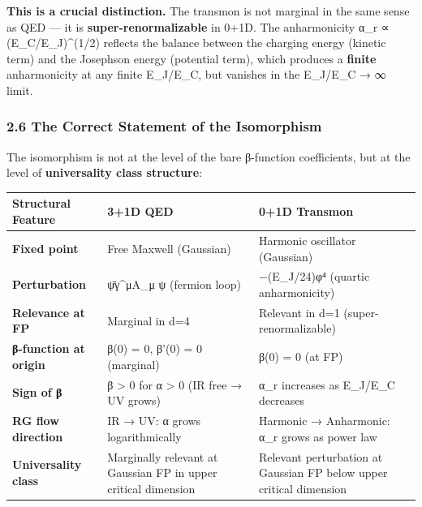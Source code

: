 \documentclass[
]{article}
\newcounter{none} %
\begin{document}
\textbf{This is a crucial distinction.} The transmon is not marginal in
the same sense as QED --- it is \textbf{super-renormalizable} in 0+1D.
The anharmonicity α\_r ∝ (E\_C/E\_J)\^{}(1/2) reflects the balance
between the charging energy (kinetic term) and the Josephson energy
(potential term), which produces a \textbf{finite} anharmonicity at any
finite E\_J/E\_C, but vanishes in the E\_J/E\_C → ∞ limit.

\subsubsection{2.6 The Correct Statement of the
Isomorphism}\label{the-correct-statement-of-the-isomorphism}

The isomorphism is not at the level of the bare β-function coefficients,
but at the level of \textbf{universality class structure}:

{\def\LTcaptype{none} %
\begin{longtable}[]{@{}
  >{\raggedright\arraybackslash}p{}
  >{\raggedright\arraybackslash}p{}
  >{\raggedright\arraybackslash}p{}@{}}
\toprule\noalign{}
\begin{minipage}[b]{\linewidth}\raggedright
Structural Feature
\end{minipage} & \begin{minipage}[b]{\linewidth}\raggedright
3+1D QED
\end{minipage} & \begin{minipage}[b]{\linewidth}\raggedright
0+1D Transmon
\end{minipage} \\
\midrule\noalign{}
\endhead
\bottomrule\noalign{}
\endlastfoot
\textbf{Fixed point} & Free Maxwell (Gaussian) & Harmonic oscillator
(Gaussian) \\
\textbf{Perturbation} & ψ̄γ\^{}μA\_μ ψ (fermion loop) & −(E\_J/24)φ⁴
(quartic anharmonicity) \\
\textbf{Relevance at FP} & Marginal in d=4 & Relevant in d=1
(super-renormalizable) \\
\textbf{β-function at origin} & β(0) = 0, β'(0) = 0 (marginal) & β(0) =
0 (at FP) \\
\textbf{Sign of β} & β \textgreater{} 0 for α \textgreater{} 0 (IR free
→ UV grows) & α\_r increases as E\_J/E\_C decreases \\
\textbf{RG flow direction} & IR → UV: α grows logarithmically & Harmonic
→ Anharmonic: α\_r grows as power law \\
\textbf{Universality class} & Marginally relevant at Gaussian FP in
upper critical dimension & Relevant perturbation at Gaussian FP below
upper critical dimension \\
\end{longtable}
}
\end{document}

